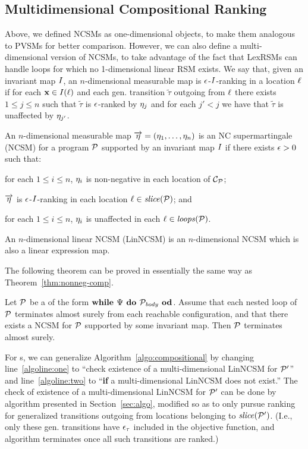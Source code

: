 \subsection{Multidimensional Compositional Ranking}

 Above, we defined NCSMs as one-dimensional objects, to make them analogous to PVSMs for better comparison. However, we can also define a multi-dimensional version of NCSMs, to take advantage of the fact that LexRSMs can handle loops for which no 1-dimensional linear RSM exists. We say that, given an invariant map $I$, an $n$-dimensional measurable map is $\epsilon$-$I$-ranking in a location $\ell$ if for each $\mathbf{x}\in I(\ell)$ and each gen. transition $\tilde{\tau}$ outgoing from $\ell$ there exists $1\leq j \leq n$ such that $\tilde\tau$ is $\epsilon$-ranked by $\eta_j$ and for each $j'<j$ we have that  $\tilde{\tau}$ is unaffected by $\eta_{j'}$.

\begin{definition}
An $n$-dimensional measurable map $\overrightarrow{\eta}=(\eta_1,\dots,\eta_n)$ 
is an NC supermartingale (NCSM) for a program $\mathcal{P}$ supported by an 
invariant map $I$ if there exists $\epsilon>0$ such that:
\begin{compactenum}
	\item  for each $1\leq i \leq n$, $\eta_i$ is non-negative in each location of $\mathcal{C}_{\mathcal{P}}$;
	\item 
	$\overrightarrow{\eta}$ is $\epsilon$-$I$-ranking in each location 
	$\ell\in\mathit{slice}{(\mathcal{P})}$; and
	\item 
	for each $1\leq i \leq n$, $\eta_i$ is
	unaffected in each $\ell\in\mathit{loops}(\mathcal{P})$.
\end{compactenum}
An $n$-dimensional linear NCSM (LinNCSM) is an $n$-dimensional NCSM which is also a linear expression map.
\end{definition}

The following theorem can be proved in essentially the same way as Theorem~\ref{thm:nonneg-comp}.

\begin{theorem}
Let $\mathcal{P}$ be a \PP{} of the form $\textbf{while } \Psi \textbf{ do } 
\mathcal{P}_{\mathit{body}} \textbf{ od}$. Assume that each nested loop of $\mathcal{P}$ terminates almost surely from each reachable configuration, and that there exists a NCSM for $\mathcal{P}$ supported by some invariant map. Then $\mathcal{P}$ terminates almost surely.
\end{theorem}

For \APP{}s, we can generalize Algorithm~\ref{algo:compositional} by changing line~\ref{algoline:one} to ``check existence of a multi-dimensional LinNCSM for $\mathcal{P}'$'' and line~\ref{algoline:two} to ``\textbf{if} a multi-dimensional LinNCSM does not exist.'' The check of existence of a multi-dimensional LinNCSM for $\mathcal{P}'$ can be done by algorithm presented in Section~\ref{sec:algo}, modified so as to only pursue ranking for generalized transitions outgoing from locations belonging to $\mathit{slice}(\mathcal{P}')$. (I.e., only these gen. transitions have $\epsilon_{\tau}$ included in the objective function, and algorithm terminates once all such transitions are ranked.) %


